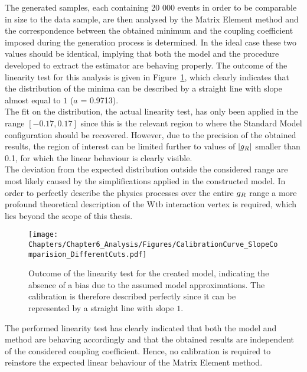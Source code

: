 The generated samples, each containing 20 000 events in order to be comparable in size to the data sample, are then analysed by the Matrix Element method and the correspondence between the obtained minimum and the coupling coefficient imposed during the generation process is determined. 
In the ideal case these two values should be identical, implying that both the model and the procedure developed to extract the estimator are behaving properly.
The outcome of the linearity test for this analysis is given in Figure~\ref{fig::CalibCurve}, which clearly indicates that the distribution of the minima can be described by a straight line with slope almost equal to $1$ ($a$ = 0.9713).
\\
The fit on the distribution, the actual linearity test, has only been applied in the range $\left[-0.17, 0.17\right]$ since this is the relevant region to where the Standard Model configuration should be recovered. However, due to the precision of the obtained results, the region of interest can be limited further to values of $\vert g_{R} \vert$ smaller than 0.1, for which the linear behaviour is clearly visible.
\\
The deviation from the expected distribution outside the considered range are most likely caused by the simplifications applied in the constructed model. In order to perfectly describe the physics processes over the entire $g_{R}$ range a more profound theoretical description of the Wtb interaction vertex is required, which lies beyond the scope of this thesis.
\begin{figure}[h!t]
 \centering
 \texttt{[image: Chapters/Chapter6\_Analysis/Figures/CalibrationCurve\_SlopeComparision\_DifferentCuts.pdf]}
 \caption{Outcome of the linearity test for the created model, indicating the absence of a bias due to the assumed model approximations. The calibration is therefore described perfectly since it can be represented by a straight line with slope $1$.} \label{fig::CalibCurve}
\end{figure}
%

The performed linearity test has clearly indicated that both the model and method are behaving accordingly and that the obtained results are independent of the considered coupling coefficient.
Hence, no calibration is required to reinstore the expected linear behaviour of the Matrix Element method.


